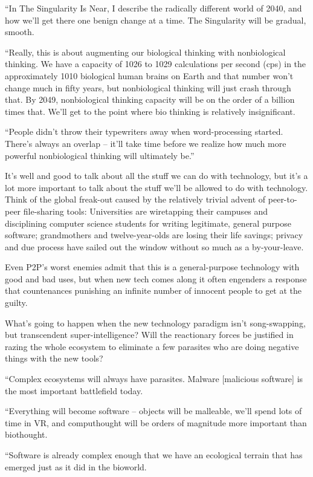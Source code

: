 ``In The Singularity Is Near, I describe the radically different
world of 2040, and how we'll get there one benign change at a time.
The Singularity will be gradual, smooth.

``Really, this is about augmenting our biological thinking with
nonbiological thinking. We have a capacity of 1026 to 1029
calculations per second (cps) in the approximately 1010 biological
human brains on Earth and that number won't change much in fifty
years, but nonbiological thinking will just crash through that. By
2049, nonbiological thinking capacity will be on the order of a
billion times that. We'll get to the point where bio thinking is
relatively insignificant.

``People didn't throw their typewriters away when word-pro\-cessing
started. There's always an overlap -- it'll take time before we
realize how much more powerful nonbiological thinking will
ultimately be.''

It's well and good to talk about all the stuff we can do with
technology, but it's a lot more important to talk about the stuff
we'll be allowed to do with technology. Think of the global
freak-out caused by the relatively trivial advent of peer-to-peer
file-sharing tools: Universities are wiretapping their campuses and
disciplining computer science students for writing legitimate,
general purpose software; grandmothers and twelve-year-olds are
losing their life savings; privacy and due process have sailed out
the window without so much as a by-your-leave.

Even P2P's worst enemies admit that this is a general-purpose
technology with good and bad uses, but when new tech comes along it
often engenders a response that countenances punishing an infinite
number of innocent people to get at the guilty.

What's going to happen when the new technology paradigm isn't
song-swapping, but transcendent super-intelligence? Will the
reactionary forces be justified in razing the whole ecosystem to
eliminate a few parasites who are doing negative things with the
new tools?

``Complex ecosystems will always have parasites. Malware [malicious
software] is the most important battlefield today.

``Everything will become software -- objects will be malleable,
we'll spend lots of time in VR, and computhought will be orders of
magnitude more important than biothought.

``Software is already complex enough that we have an ecological
terrain that has emerged just as it did in the bioworld.

